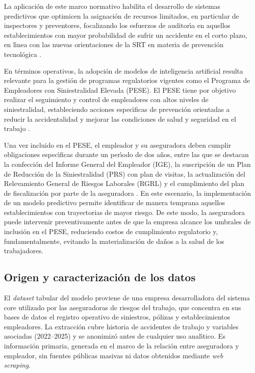 La aplicaci\'on de este marco normativo habilita el desarrollo de sistemas predictivos que optimicen la asignaci\'on de recursos limitados, en particular de inspectores y preventores, focalizando los esfuerzos de auditor\'{\i}a en aquellos establecimientos con mayor probabilidad de sufrir un accidente en el corto plazo, en l\'{\i}nea con las nuevas orientaciones de la SRT en materia de prevenci\'on tecnol\'ogica \parencite{srt_prevencion40,srt_res48_2025}.

En t\'erminos operativos, la adopci\'on de modelos de inteligencia artificial resulta relevante para la gesti\'on de programas regulatorios vigentes como el Programa de Empleadores con Siniestralidad Elevada (PESE). El PESE tiene por objetivo realizar el seguimiento y control de empleadores con altos niveles de siniestralidad, estableciendo acciones espec\'{\i}ficas de prevenci\'on orientadas a reducir la accidentalidad y mejorar las condiciones de salud y seguridad en el trabajo \parencite{srt_pese}.

Una vez incluido en el PESE, el empleador y su aseguradora deben cumplir obligaciones espec\'{\i}ficas durante un per\'{\i}odo de dos a\~nos, entre las que se destacan la confecci\'on del Informe General del Empleador (IGE), la suscripci\'on de un Plan de Reducci\'on de la Siniestralidad (PRS) con plan de visitas, la actualizaci\'on del Relevamiento General de Riesgos Laborales (RGRL) y el cumplimiento del plan de fiscalizaci\'on por parte de la aseguradora \parencite{srt_pese}. En este escenario, la implementaci\'on de un modelo predictivo permite identificar de manera temprana aquellos establecimientos con trayectorias de mayor riesgo. De este modo, la aseguradora puede intervenir preventivamente antes de que la empresa alcance los umbrales de inclusi\'on en el PESE, reduciendo costos de cumplimiento regulatorio y, fundamentalmente, evitando la materializaci\'on de da\~nos a la salud de los trabajadores.

\subsection{Origen y caracterizaci\'on de los datos}\label{sec:datos}

El \emph{dataset} tabular del modelo proviene de una empresa desarrolladora del sistema core utilizado por las aseguradoras de riesgos del trabajo, que concentra en sus bases de datos el registro operativo de siniestros, p\'olizas y establecimientos empleadores. La extracci\'on cubre historia de accidentes de trabajo y variables asociadas (2022--2025) y se anonimiz\'o antes de cualquier uso anal\'{\i}tico. Es informaci\'on primaria, generada en el marco de la relaci\'on entre aseguradora y empleador, sin fuentes p\'ublicas masivas ni datos obtenidos mediante \emph{web scraping}.


